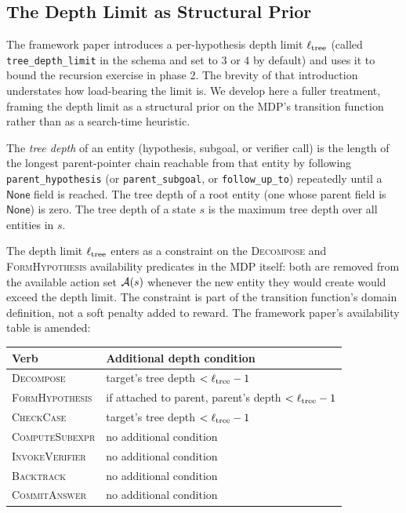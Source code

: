 \subsection{The Depth Limit as Structural Prior}
\label{sec:method-depthlimit}

The framework paper introduces a per-hypothesis depth limit
$\ell_{\mathrm{tree}}$ (called \texttt{tree\_depth\_limit} in the schema and set to
$3$ or $4$ by default) and uses it to bound the recursion exercise in
phase 2. The brevity of that introduction understates how load-bearing
the limit is. We develop here a fuller treatment, framing the depth
limit as a structural prior on the MDP's transition function rather
than as a search-time heuristic.

\begin{definition}
\label{def:tree-depth}
The \emph{tree depth} of an entity (hypothesis, subgoal, or verifier
call) is the length of the longest parent-pointer chain reachable from
that entity by following \texttt{parent\_hypothesis} (or
\texttt{parent\_subgoal}, or \texttt{follow\_up\_to}) repeatedly until
a $\textsf{None}$ field is reached. The tree depth of a root entity
(one whose parent field is $\textsf{None}$) is zero. The tree depth of
a state $s$ is the maximum tree depth over all entities in $s$.
\end{definition}

The depth limit $\ell_{\mathrm{tree}}$ enters as a constraint on the
\textsc{Decompose} and \textsc{FormHypothesis} availability predicates
in the MDP itself: both are removed from the available action set
$\mathcal{A}(s)$ whenever the new entity they would create would exceed the
depth limit. The constraint is part of the transition function's
domain definition, not a soft penalty added to reward. The framework
paper's availability table is amended:

\begin{center}
\small
\begin{tabular}{@{}ll@{}}
\toprule
Verb & Additional depth condition \\
\midrule
\textsc{Decompose}       & target's tree depth $< \ell_{\mathrm{tree}} - 1$ \\
\textsc{FormHypothesis}  & if attached to parent, parent's depth $< \ell_{\mathrm{tree}} - 1$ \\
\textsc{CheckCase}       & target's tree depth $< \ell_{\mathrm{tree}} - 1$ \\
\textsc{ComputeSubexpr}  & no additional condition \\
\textsc{InvokeVerifier}  & no additional condition \\
\textsc{Backtrack}       & no additional condition \\
\textsc{CommitAnswer}    & no additional condition \\
\bottomrule
\end{tabular}
\end{center}

